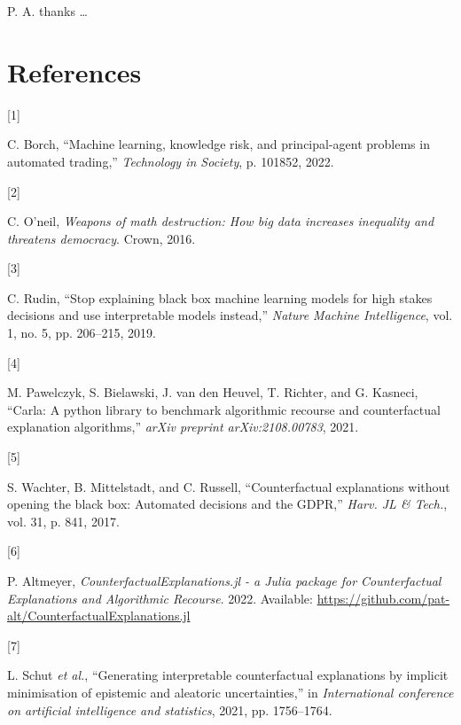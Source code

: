 \documentclass[
  conference]{IEEEtran}
\newlength{\cslhangindent}
\newlength{\csllabelwidth}
\newlength{\cslentryspacingunit} %
\newenvironment{CSLReferences}[2] %
 {%
  \setlength{\parindent}{0pt}
  \ifodd #1
  \let\oldpar\par
  \def\par{\hangindent=\cslhangindent\oldpar}
  \fi
  \setlength{\parskip}{#2\cslentryspacingunit}
 }%
 {}
\newcommand{\CSLLeftMargin}[1]{\parbox[t]{\csllabelwidth}{#1}}
\newcommand{\CSLRightInline}[1]{\parbox[t]{\linewidth - \csllabelwidth}{#1}\break}
\begin{document}
P. A. thanks \ldots{}

\pagebreak
\FloatBarrier

\hypertarget{references}{%
\section*{References}\label{references}}

\hypertarget{refs}{}
\begin{CSLReferences}{0}{0}
\leavevmode{}%
\CSLLeftMargin{{[}1{]} }%
\CSLRightInline{C. Borch, {``Machine learning, knowledge risk, and
principal-agent problems in automated trading,''} \emph{Technology in
Society}, p. 101852, 2022.}

\leavevmode{}%
\CSLLeftMargin{{[}2{]} }%
\CSLRightInline{C. O'neil, \emph{Weapons of math destruction: How big
data increases inequality and threatens democracy}. Crown, 2016.}

\leavevmode{}%
\CSLLeftMargin{{[}3{]} }%
\CSLRightInline{C. Rudin, {``Stop explaining black box machine learning
models for high stakes decisions and use interpretable models
instead,''} \emph{Nature Machine Intelligence}, vol. 1, no. 5, pp.
206--215, 2019.}

\leavevmode{}%
\CSLLeftMargin{{[}4{]} }%
\CSLRightInline{M. Pawelczyk, S. Bielawski, J. van den Heuvel, T.
Richter, and G. Kasneci, {``Carla: A python library to benchmark
algorithmic recourse and counterfactual explanation algorithms,''}
\emph{arXiv preprint arXiv:2108.00783}, 2021.}

\leavevmode{}%
\CSLLeftMargin{{[}5{]} }%
\CSLRightInline{S. Wachter, B. Mittelstadt, and C. Russell,
{``Counterfactual explanations without opening the black box: Automated
decisions and the GDPR,''} \emph{Harv. JL \& Tech.}, vol. 31, p. 841,
2017.}

\leavevmode{}%
\CSLLeftMargin{{[}6{]} }%
\CSLRightInline{P. Altmeyer, \emph{{CounterfactualExplanations.jl - a
Julia package for Counterfactual Explanations and Algorithmic
Recourse}}. 2022. Available:
\url{https://github.com/pat-alt/CounterfactualExplanations.jl}}

\leavevmode{}%
\CSLLeftMargin{{[}7{]} }%
\CSLRightInline{L. Schut \emph{et al.}, {``Generating interpretable
counterfactual explanations by implicit minimisation of epistemic and
aleatoric uncertainties,''} in \emph{International conference on
artificial intelligence and statistics}, 2021, pp. 1756--1764.}


\end{CSLReferences}
\end{document}
